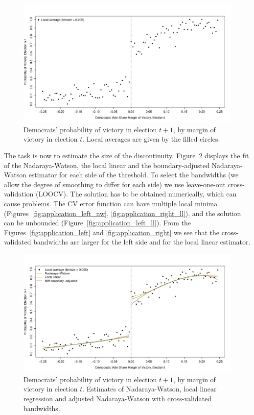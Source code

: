 \documentclass[a4paper, 12pt]{scrartcl}
\begin{document}
\begin{figure}
	\centering
	\includegraphics[trim=0 15 20 50, clip, width=\textwidth]{application_figure_01.pdf}
	\caption{Democrats' probability of victory in election $t+1$, by margin of victory in election $t$.
			 Local averages are given by the filled circles.}
	\label{fig:application_overview}
\end{figure}

The task is now to estimate the size of the discontinuity.
Figure~\ref{fig:application_fits} displays the fit of the Nadaraya-Watson, the local linear
and the boundary-adjusted Nadaraya-Watson estimator for each side of the threshold.
To select the bandwidths (we allow the degree of smoothing to differ for each side)
we use leave-one-out cross-validation (LOOCV).
The solution has to be obtained numerically, which can cause problems.
The CV error function can have multiple local minima (Figures~\ref{fig:application_left_nw}, \ref{fig:application_right_ll}),
and the solution can be unbounded (Figure~\ref{fig:application_left_ll}).
From the Figures~\ref{fig:application_left} and \ref{fig:application_right} we see that the cross-validated bandwidths
are larger for the left side and for the local linear estimator.

\begin{figure}
	\centering
	\includegraphics[trim=0 15 20 50, clip, width=\textwidth]{application_figure_02.pdf}
	\caption{Democrats' probability of victory in election $t+1$, by margin of victory in election $t$.
			 Estimates of Nadaraya-Watson, local linear regression and adjusted Nadaraya-Watson with cross-validated bandwidths.}
	\label{fig:application_fits}
\end{figure}
\end{document}
